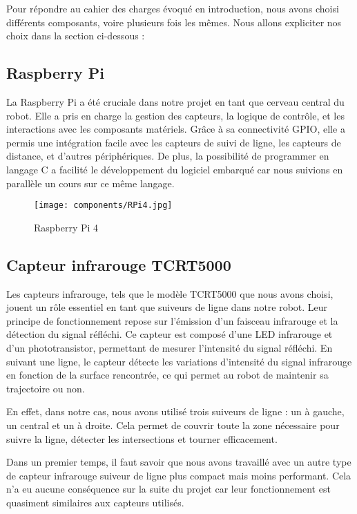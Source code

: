 Pour répondre au cahier des charges évoqué en introduction, nous avons choisi différents composants, voire plusieurs fois les mêmes. Nous allons expliciter nos choix dans la section ci-dessous :

\subsection{Raspberry Pi}
La Raspberry Pi a été cruciale dans notre projet en tant que cerveau central du robot. Elle a pris en charge la gestion des capteurs, la logique de contrôle, et les interactions avec les composants matériels. Grâce à sa connectivité GPIO, elle a permis une intégration facile avec les capteurs de suivi de ligne, les capteurs de distance, et d'autres périphériques. De plus, la possibilité de programmer en langage C a facilité le développement du logiciel embarqué car nous suivions en parallèle un cours sur ce même langage.

\begin{figure}[h]
    \centering
    \texttt{[image: components/RPi4.jpg]}
    \caption{Raspberry Pi 4}
    \label{fig:Raspberry Pi 4}
\end{figure}

\subsection{Capteur infrarouge TCRT5000}
Les capteurs infrarouge, tels que le modèle TCRT5000 que nous avons choisi, jouent un rôle essentiel en tant que suiveurs de ligne dans notre robot. Leur principe de fonctionnement repose sur l'émission d'un faisceau infrarouge et la détection du signal réfléchi. Ce capteur est composé d'une LED infrarouge et d'un phototransistor, permettant de mesurer l'intensité du signal réfléchi. En suivant une ligne, le capteur détecte les variations d'intensité du signal infrarouge en fonction de la surface rencontrée, ce qui permet au robot de maintenir sa trajectoire ou non.

En effet, dans notre cas, nous avons utilisé trois suiveurs de ligne : un à gauche, un central et un à droite. Cela permet de couvrir toute la zone nécessaire pour suivre la ligne, détecter les intersections et tourner efficacement.

Dans un premier temps, il faut savoir que nous avons travaillé avec un autre type de capteur infrarouge suiveur de ligne plus compact mais moins performant. Cela n'a eu aucune conséquence sur la suite du projet car leur fonctionnement est quasiment similaires aux capteurs utilisés.


